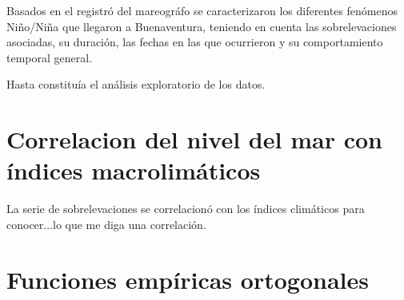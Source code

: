
Basados en el registró del mareográfo se caracterizaron los diferentes fenómenos Niño/Niña que llegaron a Buenaventura, teniendo en cuenta las sobrelevaciones asociadas, su duración, las fechas en las que ocurrieron y su comportamiento temporal general.

Hasta constituía el análisis exploratorio de los datos. 

\section{Correlacion del nivel del mar con índices macrolimáticos}
	
La serie de sobrelevaciones se correlacionó con los índices climáticos para conocer...lo que me diga una correlación.

\section{Funciones empíricas ortogonales}


